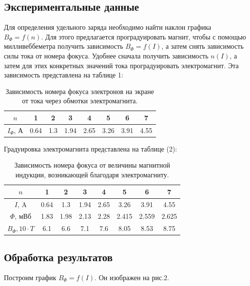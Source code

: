 \documentclass[a4paper, 14pt]{extarticle}%
\newcommand\ECaption[1]{%
     \captionsetup{font=footnotesize}%
     \caption{#1}}
\begin{document}
\subsection*{Экспериментальные данные}
Для определения удельного заряда необходимо найти наклон графика $B_{\Phi} = f(n)$. Для этого предлагается проградуировать магнит, чтобы с помощью милливеббеметра получить зависимость $B_{\Phi} = f(I)$, а затем снять зависимость силы тока от номера фокуса. Удобнее сначала получить зависимость $n(I)$, а затем для этих конкретных значений тока проградуировать электромагнит. Эта зависимость представлена на таблице 1:
\begin{table}[h!]
\begin{center}
\begin{tabular}{|c|c|c|c|c|c|c|c|}
\hline
\rowcolor[HTML]{9698ED} 
$n$ & 1    & 2   & 3    & 4    & 5    & 6    & 7    \\ \hline
$I_{\Phi}$, А & 0.64 & 1.3 & 1.94 & 2.65 & 3.26 & 3.91 & 4.55 \\ \hline
\end{tabular}
\ECaption{Зависимость номера фокуса электронов на экране от тока через обмотки электромагнита.}
\end{center}
\end{table}
Градуировка электромагнита представлена на таблице (2):
\begin{table}[h!]
\begin{center}
\begin{tabular}{|c|c|c|c|c|c|c|c|}
\hline
\rowcolor[HTML]{9698ED} 
$n$  & 1    & 2    & 3    & 4    & 5     & 6     & 7     \\ \hline
$I$, A & 0.64 & 1.3  & 1.94 & 2.65 & 3.26  & 3.91  & 4.55  \\ \hline
\rowcolor[HTML]{9698ED} 
$\Phi$, мВб  & 1.83 & 1.98 & 2.13 & 2.28 & 2.415 & 2.559 & 2.625 \\ \hline
$B_{\Phi}, 10\cdot T$  & 6.1  & 6.6  & 7.1  & 7.6  & 8.05  & 8.53  & 8.75  \\ \hline
\end{tabular}
\ECaption{Зависимость номера фокуса от величины магнитной индукции, возникающей благодаря электромагниту.}
\end{center}
\end{table} 
\subsection*{Обработка результатов}
Построим график $B_{\Phi}=f(I)$. Он изображен на рис.2. 
\end{document}
